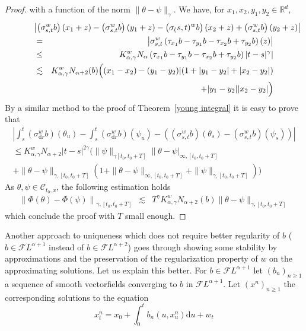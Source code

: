 \documentclass[11pt,a4paper,draft,reqno]{amsart}
\theoremstyle{definition}
\newcommand{\RR}{\mathbb{R}}
\newcommand{\cF}{\mathcal{F}}
\newcommand{\dd}{\mathrm{d}}
\newcommand{\cC}{\mathcal{C}}
\begin{document}
\begin{proof}
with a function of the norm $\|\theta-\psi\|_\gamma$.
We have, for $x_1,x_2,y_1,y_2\in\RR^d$, 
\begin{eqnarray*}
\lefteqn{\left|\left(\sigma_{s,t}^wb\right)(x_1+z)-\left(\sigma_{s,t}^wb\right)(y_1+z)-\left(\sigma_(s,t)^wb\right)(x_2+z)+\left(\sigma_{s,t}^wb\right)(y_2+z)\right|}\\
&=&
\left|\sigma^w_{s,t}\left(\tau_{x_1}b-\tau_{y_1}b-\tau_{x_2}b+\tau_{y_2}b\right)(z)\right|\\
&\le& 
K^w_{\alpha,\gamma}N_{\alpha}\left(\tau_{x_1}b-\tau_{y_1}b-\tau_{x_2}b+\tau_{y_2}b\right)
|t-s|^\gamma|\\
&\lesssim&
K^w_{\alpha,\gamma}N_{\alpha+2}(b)\Big((x_1-x_2)-(y_1-y_2)|(1+|y_1-y_2|+|x_2-y_2|)\\
&&\quad\quad\quad\quad\quad\quad+|y_1-y_2||x_2-y_2|\Big)
\end{eqnarray*}
By a similar method to the proof of Theorem~\ref{young integral} it is easy to prove that 
\begin{multline*}
\left|\int_s^t\left(\sigma^w_{\dd r}b\right)(\theta_u)-\int_s^t\left(\sigma^w_{\dd r}b\right)(\psi_u)-\left(\left(\sigma^w_{s,t}b\right)(\theta_s)-\left(\sigma^w_{s,t}b\right)(\psi_s)\right)\right|\\
\le K^w_{\alpha,\gamma}N_{\alpha+2}|t-s|^{2\gamma}
 \Bigg(\|\psi\|_{\gamma[t_0,t_0+T]}\|\theta-\psi|_{\infty,[t_0,t_0+T]}\\
 	+\|\theta-\psi\|_{\gamma,[t_0,t_0+T]}\left(1+\|\theta-\psi\|_{\infty,[t_0,t_0+T]}+\|\psi\|_{\gamma,[t_0,t_0+T]} \right)
 \Bigg)
\end{multline*}
As $\theta,\psi\in\cC_{t_0,x}$, the following estimation holds
\begin{eqnarray*}
\left\|\Phi(\theta)-\Phi(\psi)\right\|_{\gamma,[t_0,t_0+T]}
&\lesssim&
T^\gamma K^w_{\alpha,\gamma} N_{\alpha+2}(b)\|\theta-\psi\|_{\gamma,[t_0,t_0+T]}
\end{eqnarray*}
which conclude the proof with $T$ small enough. 
\end{proof}
Another approach to uniqueness which does not require better regularity of $b$ ($b\in \cF L^{\alpha+1}$ instead of $b\in \cF L^{\alpha+2}$) goes through showing some stability by approximations and the preservation of the regularization property of $w$ on the approximating solutions. Let us explain this better. For $b\in\cF L^{\alpha+1}$ let $(b_n)_{n\ge 1}$ a sequence of smooth vectorfields converging to $b$ in  $\cF L^{\alpha+1}$. Let $(x^n)_{n\ge 1}$ the corresponding solutions to the equation
\begin{equation}
\label{eq:approx-ODE}
x^n_t = x_0 +\int_0^t b_n(u,x^n_u) \dd u + w_t
\end{equation}
\end{document}
